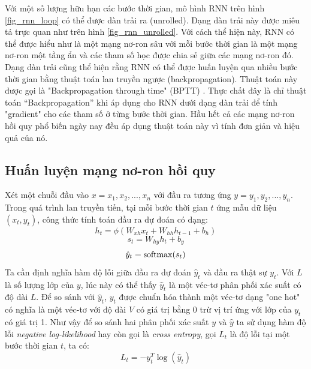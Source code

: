 Với một số lượng hữu hạn các bước thời gian, mô hình RNN trên hình \ref{fig_rnn_loop} có thể được dàn trải ra (unrolled). Dạng dàn trải này được miêu tả trực quan như trên hình \ref{fig_rnn_unrolled}. Với cách thể hiện này, RNN có thể được hiểu như là một mạng nơ-ron sâu với mỗi bước thời gian là một mạng nơ-ron một tầng ẩn và các tham số học được chia sẻ giữa các mạng nơ-ron đó. Dạng dàn trải cũng thể hiện rằng RNN có thể được huấn luyện qua nhiều bước thời gian bằng thuật toán lan truyền ngược (backpropagation). Thuật toán này được gọi là "Backpropagation through time" (BPTT) \cite{werbos1990}. Thực chất đây là chỉ thuật toán “Backpropagation” khi áp dụng cho RNN dưới dạng dàn trải để tính "gradient" cho các tham số ở từng bước thời gian. Hầu hết cả các mạng nơ-ron hồi quy phổ biến ngày nay đều áp dụng thuật toán này vì tính đơn giản và hiệu quả của nó.

\subsection{Huấn luyện mạng nơ-ron hồi quy}

Xét một chuỗi đầu vào $x={x_1,x_2,...,x_n}$ với đầu ra tương ứng $y={y_1,y_2,...,y_n}$. Trong quá trình lan truyền tiến, tại mỗi bước thời gian $t$ ứng mẫu dữ liệu $(x_t, y_t)$, công thức tính toán đầu ra dự đoán có dạng:
\begin{equation} \label{rnnForwardProp1}
	h_t = \phi \left(W_{xh} x_t + W_{hh}h_{t-1} + b_h \right) 
\end{equation}
\begin{equation} \label{rnnForwardProp2}
	s_t = W_{hy} h_t + b_y 
\end{equation}
\begin{equation} \label{rnnForwardProp3}
	\hat{y}_t = \mathrm{softmax} (s_t) 
\end{equation}
Ta cần định nghĩa hàm độ lỗi giữa đầu ra dự đoán $\hat{y}_t$ và đầu ra thật sự $y_t$. Với $L$ là số lượng lớp của $y$, lúc này có thể thấy $\hat{y}_t$ là một véc-tơ phân phối xác suất có độ dài $L$. Để so sánh với $\hat{y}_t$, $y_t$ được chuẩn hóa thành một véc-tơ dạng "one hot" có nghĩa là một véc-tơ với độ dài $V$ có giá trị bằng 0 trừ vị trí ứng với lớp của $y_t$ có giá trị 1. Như vậy để so sánh hai phân phối xác suất $y$ và $\hat{y}$ ta sử dụng hàm độ lỗi \textit{negative log-likelihood} hay còn gọi là \textit{cross entropy}, gọi $L_t$ là độ lỗi tại một bước thời gian $t$, ta có:
\begin{equation} \label{errorOfAnExample}
	L_t = -y_t^{T} \log(\hat{y}_t)
\end{equation}

